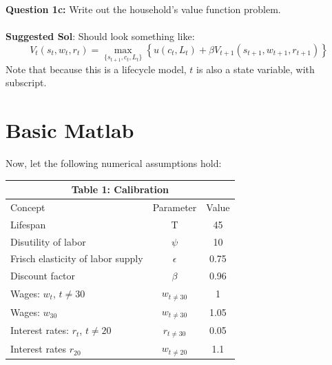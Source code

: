 \documentclass[11pt]{article}
\begin{document}
\textbf{Question 1c:} Write out the household's value function problem.\\
 \ \\
\textbf{Suggested Sol}: Should look something like:
$$V_{t}(s_t,w_t,r_t)=\underset{\{s_{t+1},c_t,L_t\}}{\max}\left\{u(c_t,L_t)+\beta V_{t+1}(s_{t+1},w_{t+1},r_{t+1})\right\}$$
Note that because this is a lifecycle model, $t$ is also a state variable, with subscript.

\clearpage
\section{Basic Matlab}
Now, let the following numerical assumptions hold:
\begin{table}[ht!]
\centering
\begin{tabular}{lcc}
\hline
\hline
\multicolumn{3}{c}{Table 1: Calibration}\\
\hline
Concept & Parameter & Value \\ 
Lifespan & T & 45 \\
Disutility of labor & $\psi$ & 10\\
Frisch elasticity of labor supply & $\epsilon$ & 0.75\\
Discount factor & $\beta$ & 0.96\\
Wages: $w_t$, $t\neq 30$ & $w_{t\neq30}$ & 1\\
Wages: $w_30$ & $w_{t\neq30}$ & 1.05\\
Interest rates: $r_t$, $t\neq 20$ & $r_{t\neq30}$ & 0.05\\
Interest rates $r_20$ & $w_{t\neq20}$ & 1.1\\
\hline
\hline
\end{tabular}
\end{table}
\end{document}
